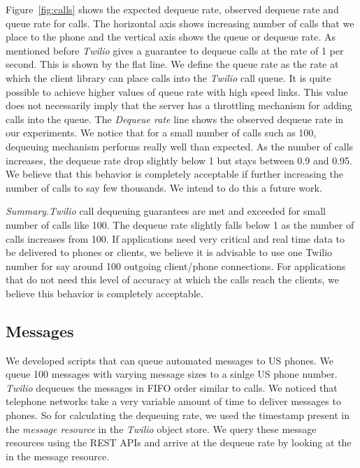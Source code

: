Figure~\ref{fig:calls} shows the expected dequeue rate, observed dequeue rate and queue rate for calls. The horizontal axis shows increasing number of calls that we place to the phone and the vertical axis shows the queue or dequeue rate. As mentioned before \textit{Twilio} gives a guarantee to dequeue calls at the rate of 1 per second. This is shown by the flat line. We define the queue rate as the rate at which the client library can place calls into the \textit{Twilio} call queue. It is quite possible to achieve higher values of queue rate with high speed links. This value does not necessarily imply that the  server has a throttling mechanism for adding calls into the queue. The \textit{Dequeue rate} line shows the observed dequeue rate in our experiments. We notice that for a small number of calls such as 100,  dequeuing mechanism performs really well than expected. As the number of calls increases, the dequeue rate drop slightly below 1 but stays between 0.9 and 0.95. We believe that this behavior is completely acceptable if further increasing the number of calls to say few thousands. We intend to do this a future work. 

\textit{Summary}.\textit{Twilio} call dequeuing guarantees are met and exceeded for small number of calls like 100. The dequeue rate slightly falls below 1 as the number of calls increases from 100. If applications need very critical and real time data to be delivered to phones or clients, we believe it is advisable to use one Twilio number for say around 100 outgoing client/phone connections. For applications that do not need this level of accuracy at which the calls reach the clients, we believe this behavior is completely acceptable. 

\subsection{Messages}
\label{sec-measurements-sms}
We developed scripts that can queue automated messages to US phones. We queue 100 messages with varying message sizes to a sinlge US phone number. \textit{Twilio} dequeues the messages in FIFO order similar to calls. We noticed that telephone networks take a very variable amount of time to deliver messages to phones. So for calculating the dequeuing rate, we used the timestamp present in the \textit{message resource} in the \textit{Twilio} object store. We query these message resources using the REST APIs and arrive at the dequeue rate by looking at the  in the message resource.   

